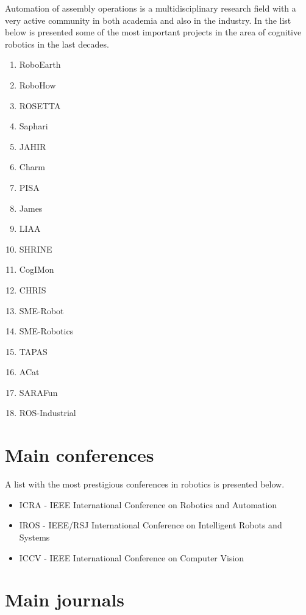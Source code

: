 Automation of assembly operations is a multidisciplinary research field with a very active community in both academia and also in the industry. In the list below is presented some of the most important projects in the area of cognitive robotics in the last decades.

\begin{multicols}{4}
	\begin{enumerate}
		\item RoboEarth
		\item RoboHow
		\item ROSETTA
		\item Saphari
		\item JAHIR
		\item Charm
		\item PISA
		\item James
		\item LIAA
		\item SHRINE
		\item CogIMon
		\item CHRIS
		\item SME-Robot
		\item SME-Robotics
		\item TAPAS
		\item ACat
		\item SARAFun
		\item ROS-Industrial
	\end{enumerate}
\end{multicols}



\section{Main conferences}

A list with the most prestigious conferences in robotics is presented below.

\begin{itemize}
	\item ICRA - IEEE International Conference on Robotics and Automation
	\item IROS - IEEE/RSJ International Conference on Intelligent Robots and Systems
	\item ICCV - IEEE International Conference on Computer Vision
\end{itemize}



\section{Main journals}

